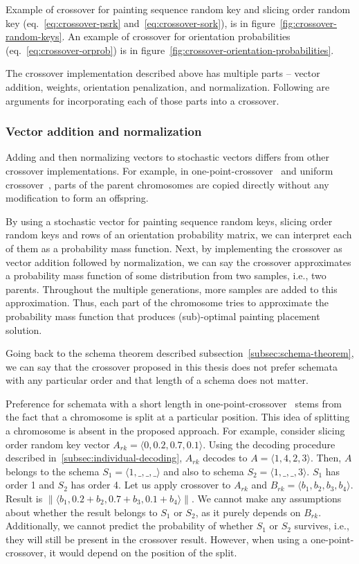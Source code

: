 Example of crossover for painting sequence random key and slicing order random key (eq.~\ref{eq:crossover-psrk} and~\ref{eq:crossover-sork}),
is in figure~\ref{fig:crossover-random-keys}.
An example of crossover for orientation probabilities (eq.~\ref{eq:crossover-orprob}) is in figure~\ref{fig:crossover-orientation-probabilities}.

The crossover implementation described above has multiple parts – vector addition, weights, orientation penalization, and normalization.
Following are arguments for incorporating each of those parts into a crossover.

\subsubsection*{Vector addition and normalization}

Adding and then normalizing vectors to stochastic vectors differs from other crossover implementations.
For example, in one-point-crossover~\cite{hollandAdaptationNaturalArtificial1975} and
uniform crossover~\cite{uniformCrossover1989}, parts of the parent chromosomes are copied directly without any modification to form an offspring.

By using a stochastic vector for painting sequence random keys, slicing order random keys and rows of an orientation probability matrix,
we can interpret each of them as a probability mass function.
Next, by implementing the crossover as vector addition followed by normalization, we can
say the crossover approximates a probability mass function of some distribution from two samples, i.e., two parents.
Throughout the multiple generations, more samples are added to this approximation.
Thus, each part of the chromosome tries to approximate the probability mass function
that produces (sub)-optimal painting placement solution.

Going back to the schema theorem described subsection~\ref{subsec:schema-theorem},
we can say that the crossover proposed in this thesis does not prefer schemata with any particular order
and that length of a schema does not matter.

Preference for schemata with a short length in one-point-crossover~\cite{hollandAdaptationNaturalArtificial1975}
stems from the fact that a chromosome is split at a particular position.
This idea of splitting a chromosome is absent in the proposed approach.
For example, consider slicing order random key vector $A_{rk} = \langle 0, 0.2, 0.7, 0.1 \rangle$.
Using the decoding procedure described in~\ref{subsec:individual-decoding},
$A_{rk}$ decodes to $A = \langle 1, 4, 2, 3 \rangle$.
Then, $A$ belongs to the schema $S_1 = \langle 1, \_, \_, \_\rangle$ and also to schema $S_2 = \langle 1, \_, \_, 3 \rangle$.
$S_1$ has order 1 and $S_2$ has order 4.
Let us apply crossover to $A_{rk}$ and $B_{rk} = \langle b_1, b_2, b_3, b_4 \rangle$.
Result is $\|\langle b_1, 0.2+b_2, 0.7+b_3, 0.1+b_4 \rangle\|$.
We cannot make any assumptions about whether the result belongs to $S_1$ or $S_2$, as it purely depends on $B_{rk}$.
Additionally, we cannot predict the probability of whether $S_1$ or $S_2$ survives, i.e., they will still be present in the crossover result.
However, when using a one-point-crossover, it would depend on the position of the split.

